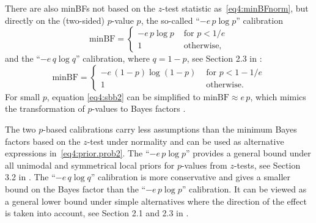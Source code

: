 There are also minBFs not based on the $z$-test statistic
as~\eqref{eq4:minBFnorm}, but directly on the (two-sided) $p$-value $p$, the
so-called ``$- e \, p \log p$'' \citep{Sellke2001} calibration
\begin{equation}
\label{eq4:sbb}
{\mbox{minBF}} =  \left\{ \begin{array}{ll} - e \, p \log p & \mbox{ for } p < 1/e \\
  1 & \mbox{ otherwise, } \end{array}   \right.
\end{equation}
and the ``$- e \, q \log q$'' calibration, where $q = 1-p$, see Section 2.3 in
\citet{Held2018}:
\begin{equation}
\label{eq4:sbb2}
{\mbox{minBF}} =  \left\{ \begin{array}{ll} - e \, (1-p) \log (1-p) & \mbox{ for } p < 1-1/e \\
  1 & \mbox{ otherwise. } \end{array}   \right.
\end{equation}
For small $p$, equation \eqref{eq4:sbb2} can be simplified to
${\mbox{minBF}} \approx e \, p$, which mimics the \citet{Good1958}
transformation of $p$-values to Bayes factors \citep{Held2019b}.

The two $p$-based calibrations carry less assumptions than the minimum Bayes
factors based on the $z$-test under normality and can be used as alternative
expressions in~\eqref{eq4:prior.prob2}. The ``$- e \, p \log p$'' provides a
general bound under all unimodal and symmetrical local priors for $p$-values
from $z$-tests, see Section 3.2 in \citet{Sellke2001}. The ``$- e \, q \log q$''
calibration is more conservative and gives a smaller bound on the Bayes factor
than the ``$- e \, p \log p$'' calibration. It can be viewed as a general lower
bound under simple alternatives where the direction of the effect is taken into
account, see Section 2.1 and 2.3 in \citet{Held2018}.


